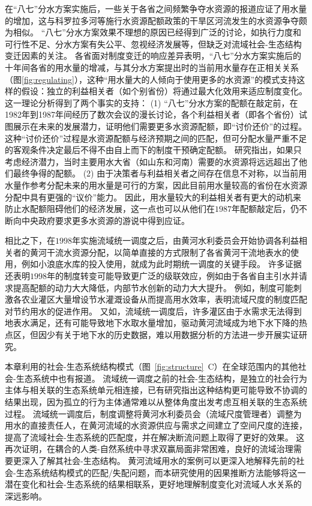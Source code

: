 在“八七”分水方案实施后，一些关于各省之间频繁争夺水资源的报道应证了用水量的增加，这与科罗拉多河等施行水资源配额政策的干旱区河流发生的水资源争夺颇为相似\cite{grafton2013, schmandt2021a}。
“八七”分水方案效果不理想的原因已经得到广泛的讨论，如执行力度和可行性不足、分水方案有失公平、忽视经济发展等，但缺乏对流域社会-生态结构变迁因素的关注\cite{wang2019b,wang2019a}。
各省面对制度变迁的响应差异表明，“八七”分水方案实施后的十年间各省的用水量的增减，与其分水方案提出时的当前用水量存在正相关关系（图\ref{fig:regulating}），这种“用水量大的人倾向于使用更多的水资源”的模式支持这样的假设：独立的利益相关者（如个别省份）将通过最大化效用来适应制度变化。
这一理论分析得到了两个事实的支持：
(1) “八七”分水方案的配额在敲定前，在1982年到1987年间经历了数次会议的漫长讨论，各个利益相关者（即各个省份）试图展示在未来的发展潜力，证明他们需要更多水资源配额，即“讨价还价”的过程\cite{wang2019a, wang2019d}。
这种“讨价还价”过程是水资源配额与经济预期之间的匹配，但可分配水量严重不足的客观条件决定最后不得不由自上而下的制度干预确定配额。
研究指出，如果只考虑经济潜力，当时主要用水大省（如山东和河南）需要的水资源将远远超出了他们最终争得的配额\cite{zuo2020}。
(2) 由于决策者与利益相关者之间存在信息不对称，以当前用水量作参考分配未来的用水量是可行的方案，因此目前用水量较高的省份在水资源分配中具有更强的“议价”能力。
因此，用水量较大的利益相关者有更大的动机来防止水配额阻碍他们的经济发展，这一点也可以从他们在$1987$年配额敲定后，仍不断向中央政府要求更多水资源的游说中得到应证\cite{wang2019a, wang2019d}。


相比之下，在$1998$年实施流域统一调度之后，由黄河水利委员会开始协调各利益相关者的黄河干流水资源分配，以简单直接的方式限制了各省黄河干流地表水的使用，例如小浪底水库的投入使用，就成为此时期统一调度的关键手段。
许多证据还表明$1998$年的制度转变可能导致更广泛的级联效应，例如由于各省自主引水并请求提高配额的动力大大降低，内部节水创新的动力大大提升。
例如，制度可能刺激各农业灌区大量增设节水灌溉设备从而提高用水效率，表明流域尺度的制度匹配对节约用水的促进作用\cite{krieger1955, ostrom1990}。
又如，流域统一调度后，许多灌区由于水需求无法得到地表水满足，还有可能导致地下水取水量增加，驱动黄河流域成为地下水下降的热点区\cite{sun2022b}，但因少有关于地下水的历史数据，难以用数据分析的方法进一步开展实证研究。

本章利用的社会-生态系统结构模式（图~\ref{fig:structure}~C）在全球范围内的其他社会-生态系统中也有报道。
流域统一调度之前的社会-生态结构，是独立的社会行为主体与相关联的生态系统单元相连接，已有研究指出这种结构更可能导致不协调的结果出现，因为孤立的行为主体通常难以从整体角度出发考虑互相关联的生态系统过程\cite{sayles2017,sayles2019,cai2016,bergsten2019}。
流域统一调度后，制度调整将黄河水利委员会（流域尺度管理者）调整为用水的直接责任人，在黄河流域的水资源供应与需求之间建立了空间尺度的连接，提高了流域社会-生态系统的匹配度，并在解决断流问题上取得了更好的效果\cite{cumming2020a,wang2019d}。
这再次证明，在耦合的人类-自然系统中寻求双赢局面非常困难\cite{hegwood2022}，良好的流域治理需要更深入了解其社会-生态结构\cite{bergsten2019, sayles2019}。
黄河流域用水的案例可以更深入地解释先前的社会-生态系统结构模式的匹配/失配问题，而本研究使用的因果推断方法能够将这一潜在变化和社会-生态系统的结果相联系，更好地理解制度变化对流域人水关系的深远影响。

